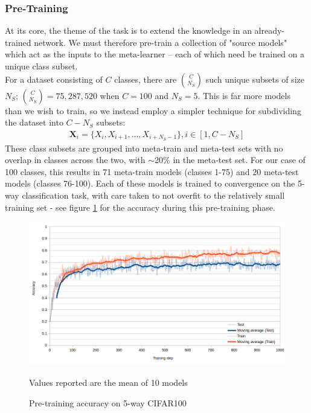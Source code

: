 \documentclass{report}
\begin{document}
\subsubsection{Pre-Training} \label{pre-training}
At its core, the theme of the task is to extend the knowledge in an already-trained network. We must therefore pre-train a collection of "source models" which act as the inputs to the meta-learner -- each of which need be trained on a unique class subset. \\
For a dataset consisting of $C$ classes, there are ${C\choose N_S}$ such unique subsets of size $N_S$; ${C\choose N_S} = 75,287,520$ when $C=100$ and $N_S=5$. This is far more models than we wish to train, so we instead employ a simpler technique for subdividing the dataset into $C-N_S$ subsets: 
\begin{align}
	\bm{X}_i = \lbrace X_i, X_{i+1}, ..., X_{i+N_S-1} \rbrace, i \in[1, C-N_S] 
\end{align}
These class subsets are grouped into meta-train and meta-test sets with no overlap in classes across the two, with $\sim$20\% in the meta-test set. For our case of 100 classes, this results in 71 meta-train models (classes 1-75) and 20 meta-test models (classes 76-100). Each of these models is trained to convergence on the 5-way classification task, with care taken to not overfit to the relatively small training set - see figure \ref{fig:pre-training-acc:1} for the accuracy during this pre-training phase. \\

\begin{figure}[h!]
	\centering
	\includegraphics[width=16cm]{pre-training-acc}
	\caption{Pre-training accuracy on 5-way CIFAR100}
	\label{fig:pre-training-acc:1}
	Values reported are the mean of 10 models
\end{figure}
\end{document}
